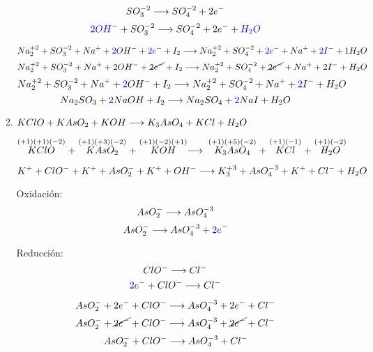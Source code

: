 \documentclass[../practica.root.tex]{subfiles}
\begin{document}
\begin{enumerate}
\begin{enumerate}

                    \[ SO_3^{-2} \longrightarrow{} SO_4^{-2} + 2 e^- \]
                    \[ \textcolor{blue}{2 OH^-} + SO_3^{-2} \longrightarrow{} SO_4^{-2} + 2 e^- + \textcolor{blue}{H_2O} \]

                    \[ Na_2^{+2} + SO_3^{-2} + Na^+ + \textcolor{blue}{2} OH^- + \textcolor{blue}{2 e^-} + I_2 \\
                        \longrightarrow{} Na_2^{+2} + SO_4^{-2} + \textcolor{blue}{2 e^-} + Na^+ + \textcolor{blue}{2} I^- + \textcolor{blue}{1} H_2O \]
                    \[ Na_2^{+2} + SO_3^{-2} + Na^+ + 2 OH^- + \cancel{2 e^-} + I_2 \\
                        \longrightarrow{} Na_2^{+2} + SO_4^{-2} + \cancel{2 e^-} + Na^+ + 2 I^- + H_2O \]
                    \[ Na_2^{+2} + SO_3^{-2} + Na^+ + \textcolor{blue}{2} OH^- + I_2 \\
                        \longrightarrow{} Na_2^{+2} + SO_4^{-2} + Na^+ + \textcolor{blue}{2} I^- + H_2O \]
                    \[ Na_2SO_3 + \textcolor{blue}{2} NaOH + I_2 \longrightarrow{} Na_2SO_4 + \textcolor{blue}{2} NaI + H_2O \]

              \item $KClO + KAsO_2 + KOH \longrightarrow{} K_3AsO_4 + KCl + H_2O$

                    $\stackrel{(+1)(+1)(-2)}{KClO} + \stackrel{(+1)(+3)(-2)}{KAsO_2} + \stackrel{(+1)(-2)(+1)}{KOH}
                        \longrightarrow{} \stackrel{(+1)(+5)(-2)}{K_3AsO_4} + \stackrel{(+1)(-1)}{KCl} + \stackrel{(+1)(-2)}{H_2O}$

                    \[ K^+ + ClO^- + K^+ + AsO_2^- + K^+ + OH^- \longrightarrow{} K_3^{+3} + AsO_4^{-3} + K^+ + Cl^- + H_2O \]
                    \begin{multicols}{2}
                        Oxidación:
                        \[ AsO_2^- \longrightarrow{} AsO_4^{-3} \]
                        \[ AsO_2^- \longrightarrow{} AsO_4^{-3} + \textcolor{blue}{2e^-} \]

                        \columnbreak

                        Reducción:
                        \[ ClO^- \longrightarrow{} Cl^- \]
                        \[ \textcolor{blue}{2e^-} + ClO^- \longrightarrow{} Cl^- \]
                    \end{multicols}

                    \[ AsO_2^- + 2e^- + ClO^- \longrightarrow{} AsO_4^{-3} + 2e^- + Cl^- \]
                    \[ AsO_2^- + \cancel{2e^-} + ClO^- \longrightarrow{} AsO_4^{-3} + \cancel{2e^-} + Cl^- \]
                    \[ AsO_2^- + ClO^- \longrightarrow{} AsO_4^{-3} + Cl^- \]


\end{enumerate}
\end{enumerate}
\end{document}
